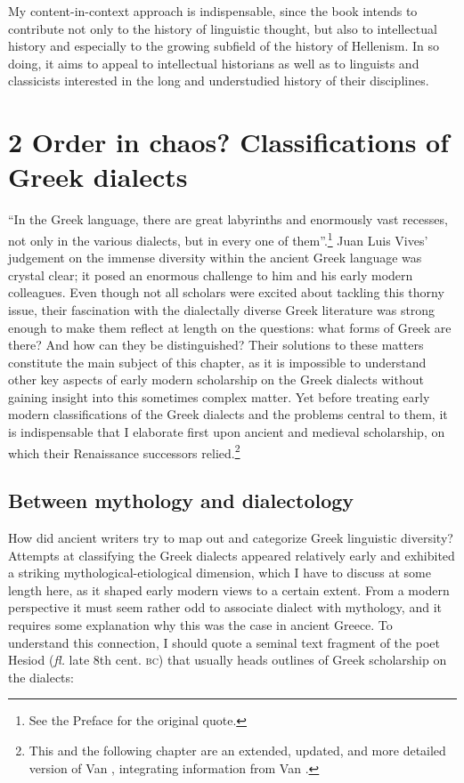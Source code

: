 My content-in-context approach is indispensable, since the book intends to contribute not only to the history of linguistic thought, but also to intellectual history and especially to the growing subfield of the history of Hellenism. In so doing, it aims to appeal to intellectual historians as well as to linguists and classicists interested in the long and understudied history of their disciplines.

\section{2  Order in chaos? Classifications of Greek dialects}
\hypertarget{Toc19704806}{}
“In the Greek language, there are great labyrinths and enormously vast recesses, not only in the various dialects, but in every one of them”.\footnote{See the Preface for the original quote.} Juan Luis Vives’ judgement on the immense diversity within the ancient Greek language was crystal clear; it posed an enormous challenge to him and his early modern colleagues. Even though not all scholars were excited about tackling this thorny issue, their fascination with the dialectally diverse Greek literature was strong enough to make them reflect at length on the questions: what forms of Greek are there? And how can they be distinguished? Their solutions to these matters constitute the main subject of this chapter, as it is impossible to understand other key aspects of early modern scholarship on the Greek dialects without gaining insight into this sometimes complex matter. Yet before treating early modern classifications of the Greek dialects and the problems central to them, it is indispensable that I elaborate first upon ancient and medieval scholarship, on which their Renaissance successors relied.\footnote{This and the following chapter are an extended, updated, and more detailed version of Van \citet{Rooy2016a}, integrating information from Van \citet{Rooy2018b}.}

\subsection{Between mythology and dialectology}
\hypertarget{Toc19704807}{}
How did ancient writers try to map out and categorize Greek linguistic diversity? Attempts at classifying the Greek dialects appeared relatively early and exhibited a striking mythological-etiological dimension, which I have to discuss at some length here, as it shaped early modern views to a certain extent. From a modern perspective it must seem rather odd to associate dialect with mythology, and it requires some explanation why this was the case in ancient Greece. To understand this connection, I should quote a seminal text fragment of the poet Hesiod (\textit{fl.} late 8th cent. \textsc{bc}) that usually heads outlines of Greek scholarship on the dialects:

